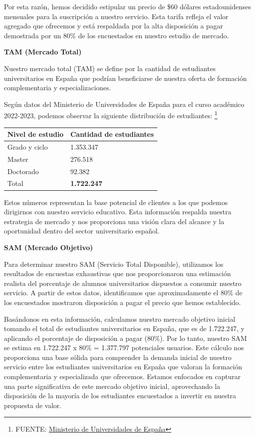 \documentclass[
]{article}
\begin{document}
Por esta razón, hemos decidido estipular un precio de \$60 dólares
estadounidenses mensuales para la suscripción a nuestro servicio. Esta
tarifa refleja el valor agregado que ofrecemos y está respaldada por la
alta disposición a pagar demostrada por un 80\% de los encuestados en
nuestro estudio de mercado.

\textbf{TAM (Mercado Total)}

Nuestro mercado total (TAM) se define por la cantidad de estudiantes
universitarios en España que podrían beneficiarse de nuestra oferta de
formación complementaria y especializaciones.

Según datos del Ministerio de Universidades de España para el curso
académico 2022-2023, podemos observar la siguiente distribución de
estudiantes: \footnote{FUENTE:
  \href{https://www.universidades.gob.es/wp-content/uploads/2023/06/Principales-resultados_EEU_2022-23.pdf}{Ministerio
  de Universidades de España}}

\begin{longtable}[]{@{}ll@{}}
\toprule\noalign{}
Nivel de estudio & Cantidad de estudiantes \\
\midrule\noalign{}
\endhead
\bottomrule\noalign{}
\endlastfoot
Grado y ciclo & 1.353.347 \\
Master & 276.518 \\
Doctorado & 92.382 \\
Total & \textbf{1.722.247} \\
\end{longtable}

Estos números representan la base potencial de clientes a los que
podemos dirigirnos con nuestro servicio educativo. Esta información
respalda nuestra estrategia de mercado y nos proporciona una visión
clara del alcance y la oportunidad dentro del sector universitario
español.

\textbf{SAM (Mercado Objetivo)}

Para determinar nuestro SAM (Servicio Total Disponible), utilizamos los
resultados de encuestas exhaustivas que nos proporcionaron una
estimación realista del porcentaje de alumnos universitarios dispuestos
a consumir nuestro servicio. A partir de estos datos, identificamos que
aproximadamente el 80\% de los encuestados mostraron disposición a pagar
el precio que hemos establecido.

Basándonos en esta información, calculamos nuestro mercado objetivo
inicial tomando el total de estudiantes universitarios en España, que es
de 1.722.247, y aplicando el porcentaje de disposición a pagar (80\%).
Por lo tanto, nuestro SAM se estima en 1.722.247 x 80\% = 1.377.797
potenciales usuarios. Este cálculo nos proporciona una base sólida para
comprender la demanda inicial de nuestro servicio entre los estudiantes
universitarios en España que valoran la formación complementaria y
especializada que ofrecemos. Estamos enfocados en capturar una parte
significativa de este mercado objetivo inicial, aprovechando la
disposición de la mayoría de los estudiantes encuestados a invertir en
nuestra propuesta de valor.
\end{document}
